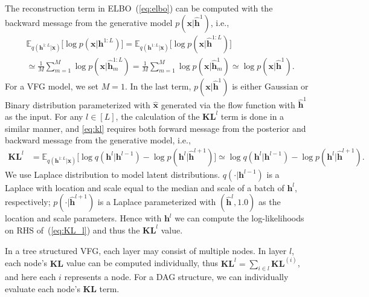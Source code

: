 \documentclass{article}
\begin{document}
The reconstruction term in ELBO~(\ref{eq:elbo}) can be computed with the backward message from the generative model $p(\mathbf{x}| \widehat{\mathbf{h}}^{1})$, i.e.,
\begin{align*} 
&\mathbb{E}_{q(\mathbf{h}^{1:L}|\mathbf{x})}\big[ \log p(\mathbf{x}|\mathbf{h}^{1:L})\big]
=\mathbb{E}_{q(\mathbf{h}^{1:L}|\mathbf{x})}\big[ \log p(\mathbf{x}|\widehat{\mathbf{h}}^{1:L})  \big] \\
&\simeq \frac{1}{M}\sum_{m=1}^M \log p(\mathbf{x}| \widehat{\mathbf{h}}^{1:L}_m) = \frac{1}{M}\sum_{m=1}^M \log p(\mathbf{x}| \widehat{\mathbf{h}}^{1}_m) \simeq  \log p(\mathbf{x}| \widehat{\mathbf{h}}^{1}) .
 \end{align*}
For a VFG model, we set $M=1$. In the last term,  $p(\mathbf{x}| \widehat{\mathbf{h}}^{1})$ is either Gaussian or Binary distribution parameterized with $\widehat{\mathbf{x}}$ generated via the flow function with $\widehat{\mathbf{h}}^{1}$ as the input.  For any $l \in [L]$, the calculation of the $\mathbf{KL}^l$ term is done in a similar manner, and  \eqref{eq:kl} requires  both  forward message  from  the posterior and backward message from the generative model, i.e.,
\begin{align}\label{eq:KL_l}
\mathbf{KL}^l&=\mathbb{E}_{q(\mathbf{h}^{1:L}|\mathbf{x})}\big[  \log q(\mathbf{h}^{l}|\mathbf{h}^{l-1})   - \log p(\mathbf{h}^{l}|\widehat{\mathbf{h}}^{l+1}) \big] \simeq  \log q(\mathbf{h}^{l}|\mathbf{h}^{l-1})   - \log p(\mathbf{h}^{l}|\widehat{\mathbf{h}}^{l+1}).
\end{align} 
We use Laplace distribution to model latent distributions. $q(\cdot|\mathbf{h}^{l-1})$ is a Laplace with location and scale equal to the median and scale of a batch of $\mathbf{h}^{l}$, respectively; $p(\cdot|\widehat{\mathbf{h}}^{l+1})$ is a  Laplace parameterized  with  $(\widehat{\mathbf{h}}^{l}, 1.0)$ as the location and scale parameters. Hence with $\mathbf{h}^{l}$ we can compute the log-likelihoods on RHS of~(\ref{eq:KL_l}) and thus the $\mathbf{KL}^l$ value.


In a tree structured VFG, each layer may consist of multiple nodes. In layer $l$, each node's  $\mathbf{KL}$ value can be  computed individually, thus $\mathbf{KL}^l = \sum_{i\in l} \mathbf{KL}^{(i)}$, and here each $i$ represents a node. For a DAG structure, we can individually evaluate each node's $\mathbf{KL}$ term. 

\end{document}
